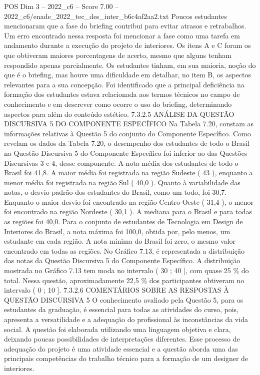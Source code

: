 \begin{textsample}{POS Dim 3 – 2022\_c6 – Score 7.00 – 2022\_c6/enade\_2022\_tec\_des\_inter\_b6c4af2aa2.txt}
Poucos estudantes mencionaram que a fase do briefing contribui para evitar atrasos e retrabalhos.
Um erro encontrado nessa resposta foi mencionar a fase como uma tarefa em andamento durante a execução do projeto de interiores.
Os itens A e C foram os que obtiveram maiores porcentagens de acerto, mesmo que alguns tenham respondido apenas parcialmente.
Os estudantes tinham, em sua maioria, noção do que é o briefing, mas houve uma dificuldade em detalhar, no item B, os aspectos relevantes para a sua concepção.
Foi identificado que a principal deficiência na formação dos estudantes estava relacionada aos termos técnicos no campo de conhecimento e em descrever como ocorre o uso do briefing, determinando aspectos para além do conteúdo estético. 7.3.2.5 ANÁLISE DA QUESTÃO DISCURSIVA 5 DO COMPONENTE ESPECÍFICO Na Tabela 7.20, constam as informações relativas à Questão 5 do conjunto do Componente Específico.
Como revelam os dados da Tabela 7.20, o desempenho dos estudantes de todo o Brasil na Questão Discursiva 5 do Componente Específico foi inferior ao das Questões Discursivas 3 e 4, desse componente.
A nota média dos estudantes de todo o Brasil foi 41,8.
A maior média foi registrada na região Sudeste ( 43 ), enquanto a menor média foi registrada na região Sul ( 40,0 ).
Quanto à variabilidade das notas, o desvio-padrão dos estudantes do Brasil, como um todo, foi 30,7.
Enquanto o maior desvio foi encontrado na região Centro-Oeste ( 31,4 ), o menor foi encontrado na região Nordeste ( 30,1 ).
A mediana para o Brasil e para todas as regiões foi 40,0.
Para o conjunto de estudantes de Tecnologia em Design de Interiores do Brasil, a nota máxima foi 100,0, obtida por, pelo menos, um estudante em cada região.
A nota mínima do Brasil foi zero, o mesmo valor encontrado em todas as regiões.
No Gráfico 7.13, é representada a distribuição das notas da Questão Discursiva 5 do Componente Específico.
A distribuição mostrada no Gráfico 7.13 tem moda no intervalo ( 30 ; 40 ], com quase 25 \% do total.
Nessa questão, aproximadamente 22,5 \% dos participantes obtiveram no intervalo ( 0 ; 10 ]. 7.3.2.6 COMENTÁRIOS SOBRE AS RESPOSTAS À QUESTÃO DISCURSIVA 5 O conhecimento avaliado pela Questão 5, para os estudantes da graduação, é essencial para todas as atividades do curso, pois, apresenta a versatilidade e a adequação do profissional às inconstâncias da vida social.
A questão foi elaborada utilizando uma linguagem objetiva e clara, deixando poucas possibilidades de interpretações diferentes.
Esse processo de adequação do projeto é uma atividade essencial e a questão aborda uma das principais competências do trabalho técnico para a formação de um designer de interiores.

\end{textsample}
